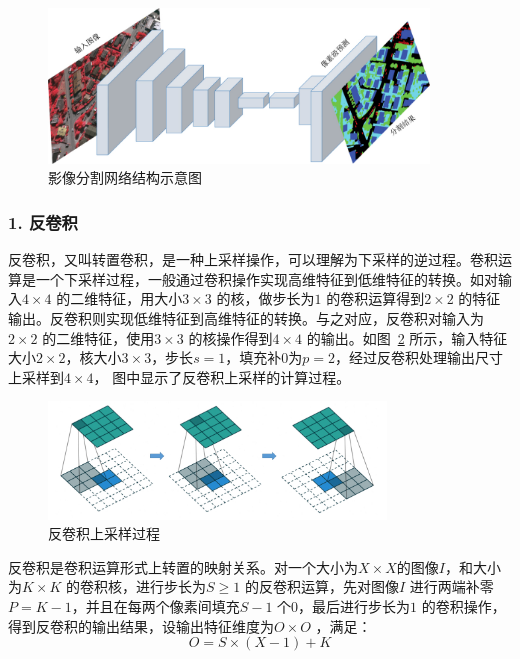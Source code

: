 \begin{figure}[htb]
  \centering
  \includegraphics[width=0.9\textwidth]{figures/FCN}
  \caption{影像分割网络结构示意图}\label{fig:fcn_structure}
\end{figure}

\subsubsection*{1. 反卷积}
\label{subsec:chap02-2-2-1}
反卷积，又叫转置卷积，是一种上采样操作，可以理解为下采样的逆过程。卷积运算是一个下采样过程，一般通过卷积操作实现高维特征到低维特征的转换。如对输入$4\times 4$ 的二维特征，用大小$3\times 3$ 的核，做步长为$1$ 的卷积运算得到$2\times 2$ 的特征输出。反卷积则实现低维特征到高维特征的转换。与之对应，反卷积对输入为$2\times 2$ 的二维特征，使用$3\times 3$ 的核操作得到$4\times 4$ 的输出。如图~\ref{fig:deconv} 所示，输入特征大小$2\times 2$，核大小$3\times 3$，步长$s=1$，填充补0为$p=2$，经过反卷积处理输出尺寸上采样到$4\times 4$， 图中显示了反卷积上采样的计算过程。

\begin{figure}[htb]
  \centering
  \includegraphics[width=0.8\textwidth]{figures/deconv}
  \caption{反卷积上采样过程}\label{fig:deconv}
\end{figure}

反卷积是卷积运算形式上转置的映射关系。对一个大小为$X\times X$的图像$\textit{I}$，和大小为$K\times K$ 的卷积核，进行步长为$S \geq 1$ 的反卷积运算，先对图像$\textit{I}$ 进行两端补零$P=K-1$，并且在每两个像素间填充$S-1$ 个$0$，最后进行步长为$1$ 的卷积操作，得到反卷积的输出结果，设输出特征维度为$O \times O$ ，满足：
\begin{equation}
  \label{eq:2-20}
  O = S \times (X - 1) + K
\end{equation}

